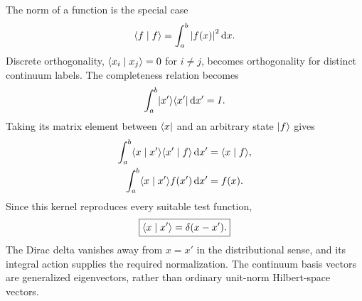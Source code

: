 The norm of a function is the special case
\[
 \langle f\mid f\rangle=\int_a^b\left\lvert f(x)\right\rvert^2\mathop{}\!\mathrm{d} x.
\]
Discrete orthogonality, $\langle x_i\mid x_j\rangle=0$ for $i\ne j$,
becomes orthogonality for distinct continuum labels. The completeness
relation becomes
\[
 \int_a^b\lvert x'\rangle\langle x'\rvert\mathop{}\!\mathrm{d} x'=I.
\]
Taking its matrix element between $\langle x\rvert$ and an arbitrary state
$\lvert f\rangle$ gives
\begin{align*}
 \int_a^b\langle x\mid x'\rangle\langle x'\mid f\rangle\mathop{}\!\mathrm{d} x'
 &=\langle x\mid f\rangle,\\
 \int_a^b\langle x\mid x'\rangle f(x')\mathop{}\!\mathrm{d} x'&=f(x).
\end{align*}
Since this kernel reproduces every suitable test function,
\[
 \boxed{\langle x\mid x'\rangle=\delta(x-x').}
\]
The Dirac delta vanishes away from $x=x'$ in the distributional
sense, and its integral action supplies the required normalization.
The continuum basis vectors are generalized eigenvectors, rather
than ordinary unit-norm Hilbert-space vectors.
